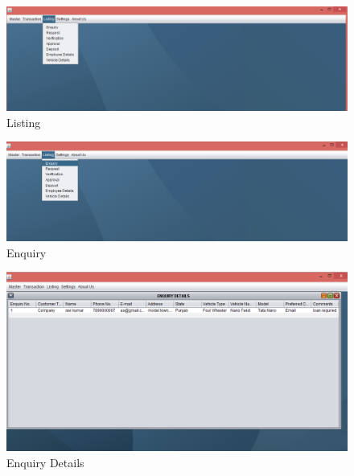 \begin{figure}[ht]
\begin{center}
\includegraphics[scale=0.5]{images/image31.png}
\end{center}
\caption{Listing}
\label{Listing}
\end{figure}


\begin{figure}[ht]
\begin{center}
\includegraphics[scale=0.5]{images/image32.png}
\end{center}
\caption{Enquiry}
\label{Enquiry}
\end{figure}

\begin{figure}[ht]
\begin{center}
\includegraphics[scale=0.5]{images/image33.png}
\end{center}
\caption{Enquiry Details}
\label{Enquiry Details}
\end{figure}















